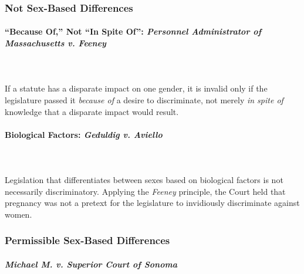 \subsubsection{Not Sex-Based Differences}

\paragraph{``Because Of,'' Not ``In Spite Of'': \emph{Personnel Administrator 
of Massachusetts v. Feeney}}
~\\\\
If a statute has a disparate impact on one gender, it is invalid only if 
the legislature passed it \emph{because of} a desire to discriminate, not 
merely \emph{in spite of} knowledge that a disparate impact would result.

% 
% 
% 
\paragraph{Biological Factors: \emph{Geduldig v. Aviello}}
~\\\\
Legislation that differentiates between sexes based on biological factors is 
not necessarily discriminatory. Applying the \emph{Feeney} principle, the 
Court held that pregnancy was not a pretext for the legislature to invidiously 
discriminate against women.

% 
\subsubsection{Permissible Sex-Based Differences}

\paragraph{\emph{Michael M. v. Superior Court of Sonoma}}

